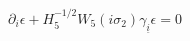 \begin{equation}
\partial_i \epsilon + H_5^{-1/2}W_5(i \sigma_2) \gamma_{\underline i} \epsilon = 0
\end{equation}

